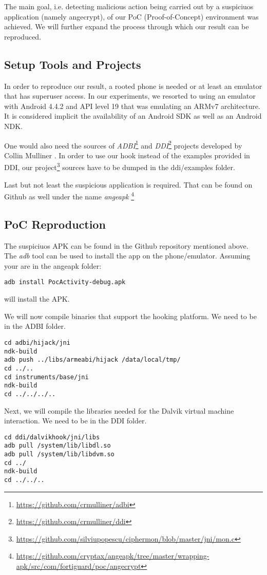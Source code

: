 The main goal, i.e. detecting malicious action being carried out by 
a suspiciuos application (namely angecrypt), of our PoC (Proof-of-Concept)
environment was achieved. We will further expand the process through
 which our result can be reproduced.

\subsection{Setup Tools and Projects}
In order to reproduce our result, a rooted phone is needed or at least an 
emulator that has superuser access. In our experiments, we resorted to 
using an emulator with Android 4.4.2 and API level 19 that was emulating 
an ARMv7 architecture. It is considered implicit the availability of an 
Android SDK as well as an Android NDK.

One would also need the sources of \emph{ADBI}\footnote{\url{https://github.com/crmulliner/adbi}}
and \emph{DDI}\footnote{\url{https://github.com/crmulliner/ddi}} 
projects developed by Collin Mulliner \cite{ddi}. In order to use our hook instead of the 
examples provided in DDI, our project\footnote{\url{https://github.com/silviupopescu/ciphermon/blob/master/jni/mon.c}} sources have to be dumped in the ddi/examples folder.

Last but not least the suspicious application is required. That can be 
found on Github as well under the name \emph{angeapk}
\footnote{\url{https://github.com/cryptax/angeapk/tree/master/wrapping-apk/src/com/fortiguard/poc/angecrypt}}

\subsection{PoC Reproduction}

The suspiciuos APK can be found in the Github repository mentioned above. 
The \emph{adb} tool can be used to install the app on the phone/emulator.
Assuming your are in the angeapk folder:
\begin{verbatim}
adb install PocActivity-debug.apk
\end{verbatim}
will install the APK.

We will now compile binaries that support the hooking platform. We 
need to be in the ADBI folder.
\begin{verbatim}
cd adbi/hijack/jni
ndk-build
adb push ../libs/armeabi/hijack /data/local/tmp/
cd ../..
cd instruments/base/jni
ndk-build
cd ../../../..
\end{verbatim}
Next, we will compile the libraries needed for the Dalvik virtual machine
interaction. We need to be in the DDI folder.
\begin{verbatim}
cd ddi/dalvikhook/jni/libs
adb pull /system/lib/libdl.so
adb pull /system/lib/libdvm.so
cd ../
ndk-build
cd ../../..
\end{verbatim}

